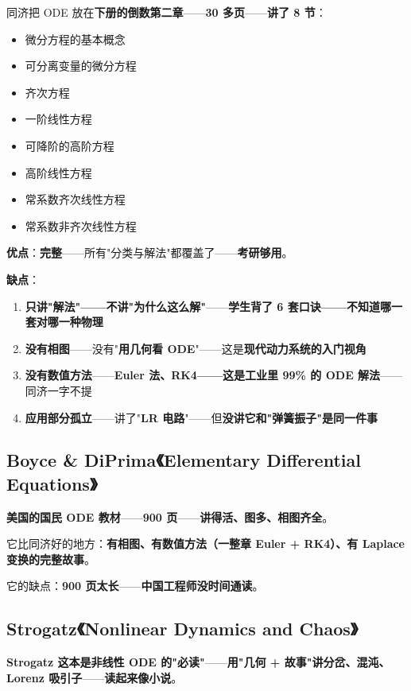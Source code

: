 同济把 ODE 放在\textbf{下册的倒数第二章}——\textbf{30 多页}——\textbf{讲了 8 节}：

\begin{itemize}
\item 微分方程的基本概念
\item 可分离变量的微分方程
\item 齐次方程
\item 一阶线性方程
\item 可降阶的高阶方程
\item 高阶线性方程
\item 常系数齐次线性方程
\item 常系数非齐次线性方程
\end{itemize}

\textbf{优点}：\textbf{完整}——所有"分类与解法"都覆盖了——\textbf{考研够用}。

\textbf{缺点}：

\begin{enumerate}
\item \textbf{只讲"解法"——不讲"为什么这么解"}——\textbf{学生背了 6 套口诀——不知道哪一套对哪一种物理}
\item \textbf{没有相图}——没有"\textbf{用几何看 ODE}"——这是\textbf{现代动力系统的入门视角}
\item \textbf{没有数值方法}——\textbf{Euler 法、RK4——这是工业里 99\% 的 ODE 解法}——同济一字不提
\item \textbf{应用部分孤立}——讲了"\textbf{LR 电路}"——但\textbf{没讲它和"弹簧振子"是同一件事}
\end{enumerate}

\subsection{Boyce \& DiPrima《Elementary Differential Equations》}

\textbf{美国的国民 ODE 教材}——\textbf{900 页}——\textbf{讲得活、图多、相图齐全}。

它比同济好的地方：\textbf{有相图、有数值方法（一整章 Euler + RK4）、有 Laplace 变换的完整故事}。

它的缺点：\textbf{900 页太长}——\textbf{中国工程师没时间通读}。

\subsection{Strogatz《Nonlinear Dynamics and Chaos》}

\textbf{Strogatz 这本是非线性 ODE 的"必读"}——\textbf{用"几何 + 故事"讲分岔、混沌、Lorenz 吸引子}——\textbf{读起来像小说}。

